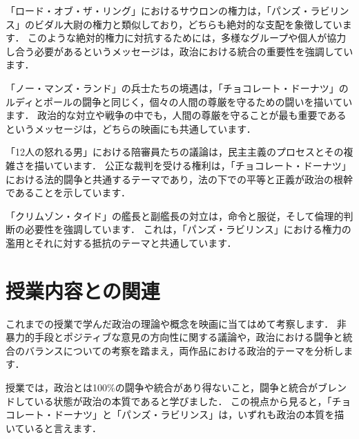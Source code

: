 \documentclass[titlepage,a4paper]{jsarticle}
\begin{document}


「ロード・オブ・ザ・リング」におけるサウロンの権力は，「パンズ・ラビリンス」のビダル大尉の権力と類似しており，どちらも絶対的な支配を象徴しています．
このような絶対的権力に対抗するためには，多様なグループや個人が協力し合う必要があるというメッセージは，政治における統合の重要性を強調しています．

「ノー・マンズ・ランド」の兵士たちの境遇は，「チョコレート・ドーナツ」のルディとポールの闘争と同じく，個々の人間の尊厳を守るための闘いを描いています．
政治的な対立や戦争の中でも，人間の尊厳を守ることが最も重要であるというメッセージは，どちらの映画にも共通しています．

「12人の怒れる男」における陪審員たちの議論は，民主主義のプロセスとその複雑さを描いています．
公正な裁判を受ける権利は，「チョコレート・ドーナツ」における法的闘争と共通するテーマであり，法の下での平等と正義が政治の根幹であることを示しています．

「クリムゾン・タイド」の艦長と副艦長の対立は，命令と服従，そして倫理的判断の必要性を強調しています．
これは，「パンズ・ラビリンス」における権力の濫用とそれに対する抵抗のテーマと共通しています．
\section{授業内容との関連}
これまでの授業で学んだ政治の理論や概念を映画に当てはめて考察します．
非暴力的手段とポジティブな意見の方向性に関する議論や，政治における闘争と統合のバランスについての考察を踏まえ，両作品における政治的テーマを分析します．

授業では，政治とは100\%の闘争や統合があり得ないこと，闘争と統合がブレンドしている状態が政治の本質であると学びました．
この視点から見ると，「チョコレート・ドーナツ」と「パンズ・ラビリンス」は，いずれも政治の本質を描いていると言えます．
\end{document}
